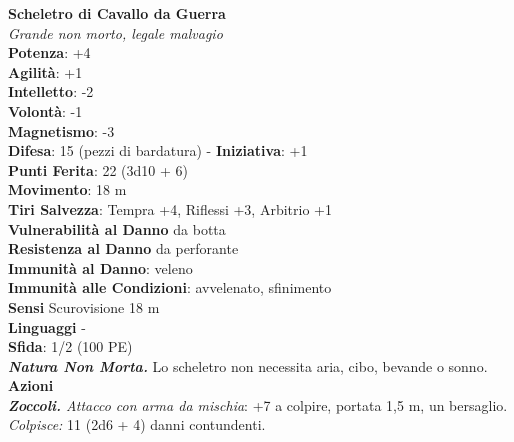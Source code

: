\begin{multicols}{2}
\medskip\textbf{Scheletro di Cavallo da Guerra}\\
\emph{Grande non morto, legale malvagio}\\
\textbf{Potenza}: +4\\
\textbf{Agilità}: +1\\
\textbf{Intelletto}: -2\\
\textbf{Volontà}: -1\\
\textbf{Magnetismo}: -3\\
\textbf{Difesa}: 15 (pezzi di bardatura) - \textbf{Iniziativa}: +1\\
\textbf{Punti Ferita}: 22 (3d10 + 6)\\
\textbf{Movimento}: 18 m\\
\textbf{Tiri Salvezza}: Tempra +4, Riflessi +3, Arbitrio +1\\
\textbf{Vulnerabilità al Danno} da botta\\
\textbf{Resistenza al Danno} da perforante\\
\textbf{Immunità al Danno}: veleno\\
\textbf{Immunità alle Condizioni}: avvelenato, sfinimento\\
\textbf{Sensi} Scurovisione 18 m\\
\textbf{Linguaggi} -\\
\textbf{Sfida}: 1/2 (100 PE)\smallskip\\
\emph{\textbf{Natura Non Morta.}} Lo scheletro non necessita aria, cibo, bevande o sonno.\\
\smallskip\textbf{Azioni}\\
\emph{\textbf{Zoccoli.} Attacco con arma da mischia}: +7 a colpire, portata 1,5 m, un bersaglio.\\
\emph{Colpisce:} 11 (2d6 + 4) danni contundenti.\\


\end{multicols}
